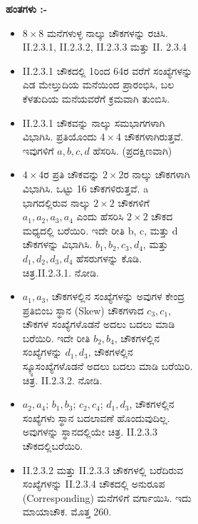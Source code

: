 \begin{figure}[H]
\begin{figure}[H]
\begin{figure}[h]
\smallskip
\textbf{ಹಂತಗಳು :-}
\begin{itemize}
	\item $8 \times 8$ ಮನೆಗಳುಳ್ಳ ನಾಲ್ಕು ಚೌಕಗಳನ್ನು ರಚಿಸಿ. II.2.3.1, II.2.3.2, II.2.3.3 ಮತ್ತು II. 2.3.4
	\item II.2.3.1 ಚೌಕದಲ್ಲಿ 1ರಿಂದ 64ರ ವರೆಗೆ ಸಂಖ್ಯೆಗಳನ್ನು ಎಡ ಮೇಲ್ತುದಿಯ ಮನೆಯಿಂದ ಪ್ರಾರಂಭಿಸಿ, ಬಲ ಕೆಳತುದಿಯ ಮನೆಯವರೆಗೆ ಕ್ರಮವಾಗಿ ತುಂಬಿಸಿ.
	\item II.2.3.1 ಚೌಕವನ್ನು ನಾಲ್ಕು ಸಮಭಾಗಗಳಾಗಿ ವಿಭಾಗಿಸಿ. ಪ್ರತಿಯೊಂದು $4 \times 4$ ಚೌಕಗಳಾಗಿರುತ್ತವೆ. ಇವುಗಳಿಗೆ $a, b, c, d$ ಹೆಸರಿಸಿ. (ಪ್ರದಕ್ಷಿಣವಾಗಿ)
	\item $4 \times 4$ರ ಪ್ರತಿ ಚೌಕವನ್ನು $2 \times 2$ರ ನಾಲ್ಕು ಚೌಕಗಳಾಗಿ ವಿಭಾಗಿಸಿ. ಒಟ್ಟು 16 ಚೌಕಗಳಿರುತ್ತವೆ. a ಭಾಗದಲ್ಲಿರುವ ನಾಲ್ಕು $2 \times 2$ ಚೌಕಗಳಿಗೆ $a_1, a_2, a_3, a_4$ ಎಂದು ಹೆಸರಿಸಿ $2 \times 2$ ಚೌಕದ ಮಧ್ಯದಲ್ಲಿ ಬರೆಯಿರಿ. ಇದೇ ರೀತಿ b, c, ಮತ್ತು d ಚೌಕಗಳನ್ನು ವಿಭಾಗಿಸಿ. $b_1, b_2, c_3, d_4$, ಮತ್ತು $d_1, d_2, d_3, d_4$ ಹೆಸರುಗಳನ್ನು ಕೊಡಿ. ಚಿತ್ರ.II.2.3.1. ನೋಡಿ.
	\item $a_1, a_3$, ಚೌಕಗಳಲ್ಲಿನ ಸಂಖ್ಯೆಗಳನ್ನು ಅವುಗಳ ಕೇಂದ್ರ ಪ್ರತಿಬಿಂಬ ಸ್ಥಾನ (Skew) ಚೌಕಗಳಾದ $c_3, c_1$, ಚೌಕಗಳ ಸಂಖ್ಯೆಗಳೊಡನೆ ಅದಲು ಬದಲು ಮಾಡಿ ಬರೆ\-ಯಿರಿ. ಇದೇ ರೀತಿ $b_2, b_4$, ಚೌಕಗಳಲ್ಲಿನ ಸಂಖ್ಯೆಗಳನ್ನು $d_1, d_3$, ಚೌಕಗಳಲ್ಲಿನ ಸ್ಕ್ಯೂ\break  ಸಂಖ್ಯೆಗಳೊಡನೆ ಅದಲು ಬದಲು ಮಾಡಿ ಬರೆಯಿರಿ. ಚಿತ್ರ. II.2.3.2. ನೋಡಿ.
	\item $a_2, a_4$; $b_1, b_3$; $c_2, c_4$; $d_1, d_3$, ಚೌಕಗಳಲ್ಲಿನ ಸಂಖ್ಯೆಗಳು ಸ್ಥಾನ ಬದ\-ಲಾವಣೆ ಹೊಂದುವುದಿಲ್ಲ. ಅವುಗಳನ್ನು ಸ್ಥಾನದಲ್ಲಿಯೇ ಚಿತ್ರ. II.2.3.3 ಚೌಕದಲ್ಲಿ\break ಬರೆಯಿರಿ.
	\item II.2.3.2 ಮತ್ತು II.2.3.3 ಚೌಕಗಳಲ್ಲಿ ಬರೆದಿರುವ ಸಂಖ್ಯೆಗಳನ್ನು II.2.3.4 ಚೌಕದಲ್ಲಿ ಅನುರೂಪ (Corresponding) ಮನೆಗಳಿಗೆ ವರ್ಗಾಯಿಸಿ. ಇದು ಮಾಯಾಚೌಕ. ಮೊತ್ತ 260.
\end{itemize}


\end{figure}
\end{figure}
\end{figure}
